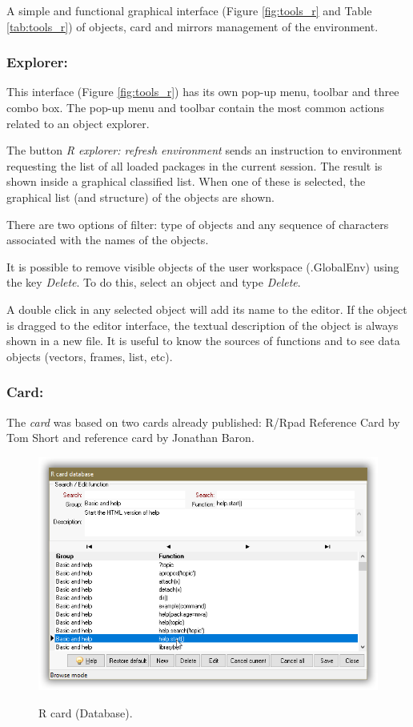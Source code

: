 A simple and functional graphical interface
(Figure \ref{fig:tools_r} and
Table \ref{tab:tools_r})
of objects, card and mirrors management of the \RR{} environment.


\subsubsection{Explorer:}

This interface
(Figure \ref{fig:tools_r})
has its own pop-up menu, toolbar and three combo box. The
pop-up menu and toolbar contain the most common actions related to an object
explorer.

The button \textit{R explorer: refresh environment} sends an instruction to
\RR{} environment requesting the list of all loaded packages in the current
session. The result is shown inside a graphical classified list. When one
of these is selected, the graphical list (and structure) of the objects
are shown.

There are two options of filter: type of objects and any sequence of
characters associated with the names of the objects.

It is possible to remove visible objects of the user workspace (.GlobalEnv)
using the key \textit{Delete}. To do this, select an object and type
\textit{Delete}.

A double click in any selected object will add its name to the editor.
If the object is dragged to the editor interface, the textual description
of the object is always shown in a new file. It is useful to know the
sources of functions and to see data objects (vectors, frames, list, etc).

\subsubsection{Card:}

The \textit{card} was based on two \RR{} cards already published:
R/Rpad Reference Card by Tom Short and \RR{} reference card by Jonathan Baron.

\begin{figure}[H]
  \includegraphics[scale=0.35]{./res/rcard_dlg.png}\\
  \caption{R card (Database).}
  \label{fig:rcard_dlg_2}
\end{figure}

